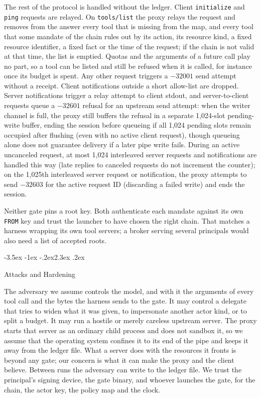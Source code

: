 \documentclass[10pt,twocolumn]{article}
\makeatletter
\theoremstyle{plain}
\theoremstyle{definition}
\renewcommand\section{\@startsection{section}{1}{\z@}%
  {-3.5ex \@plus -1ex \@minus -.2ex}{2.3ex \@plus .2ex}%
  {\normalfont\Large\bfseries\raggedright}}
\makeatother
\begin{document}
The rest of the protocol is handled without the ledger. Client \texttt{initialize} and \texttt{ping} requests are relayed. On \texttt{tools/list} the proxy relays the request and removes from the answer every tool that is missing from the map, and every tool that some mandate of the chain rules out by its action, its resource kind, a fixed resource identifier, a fixed fact or the time of the request; if the chain is not valid at that time, the list is emptied. Quotas and the arguments of a future call play no part, so a tool can be listed and still be refused when it is called, for instance once its budget is spent. Any other request triggers a $-32001$ send attempt without a receipt. Client notifications outside a short allow-list are dropped. Server notifications trigger a relay attempt to client stdout, and server-to-client requests queue a $-32601$ refusal for an upstream send attempt: when the writer channel is full, the proxy still buffers the refusal in a separate 1{,}024-slot pending-write buffer, ending the session before queueing if all 1{,}024 pending slots remain occupied after flushing (even with no active client request), though queueing alone does not guarantee delivery if a later pipe write fails. During an active uncanceled request, at most 1{,}024 interleaved server requests and notifications are handled this way (late replies to canceled requests do not increment the counter); on the 1{,}025th interleaved server request or notification, the proxy attempts to send $-32603$ for the active request ID (discarding a failed write) and ends the session.

Neither gate pins a root key. Both authenticate each mandate against its own \texttt{FROM} key and trust the launcher to have chosen the right chain. That matches a harness wrapping its own tool servers; a broker serving several principals would also need a list of accepted roots.

\section{Attacks and Hardening}
\label{sec:attacks}

The adversary we assume controls the model, and with it the arguments of every tool call and the bytes the harness sends to the gate. It may control a delegate that tries to widen what it was given, to impersonate another actor kind, or to split a budget. It may run a hostile or merely careless upstream server. The proxy starts that server as an ordinary child process and does not sandbox it, so we assume that the operating system confines it to its end of the pipe and keeps it away from the ledger file. What a server does with the resources it fronts is beyond any gate; our concern is what it can make the proxy and the client believe. Between runs the adversary can write to the ledger file. We trust the principal's signing device, the gate binary, and whoever launches the gate, for the chain, the actor key, the policy map and the clock.
\end{document}
